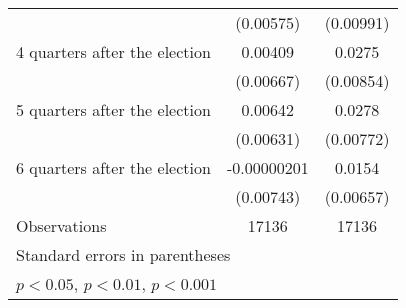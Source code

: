 \begin{table}[htbp]
\begin{tabular}{l*{2}{c}}
                    &   (0.00575)         &   (0.00991)         \\
[1em]
 4 quarters after the election&     0.00409         &      0.0275\sym{**} \\
                    &   (0.00667)         &   (0.00854)         \\
[1em]
 5 quarters after the election&     0.00642         &      0.0278\sym{***}\\
                    &   (0.00631)         &   (0.00772)         \\
[1em]
 6 quarters after the election& -0.00000201         &      0.0154\sym{*}  \\
                    &   (0.00743)         &   (0.00657)         \\
\hline
Observations        &       17136         &       17136         \\
\hline\hline
\multicolumn{3}{l}{\footnotesize Standard errors in parentheses}\\
\multicolumn{3}{l}{\footnotesize \sym{*} \(p<0.05\), \sym{**} \(p<0.01\), \sym{***} \(p<0.001\)}\\
\end{tabular}
\end{table}
